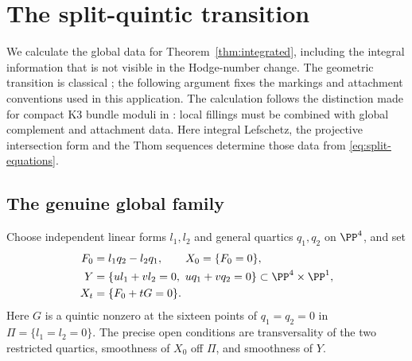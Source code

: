 \section{The split-quintic transition}\label{sec:quintic}

We calculate the global data for Theorem~\ref{thm:integrated}, including
the integral information that is not visible in the Hodge-number change.
The geometric transition is classical \cite{greene-morrison-strominger};
the following argument fixes the markings and attachment conventions
used in this application.
The calculation follows the distinction made for compact K3 bundle
moduli in \cite{wuebben-reconstruction,wuebben-attachments}: local
fillings must be combined with global complement and attachment data.
Here integral Lefschetz, the projective intersection form and the Thom
sequences determine those data from \eqref{eq:split-equations}.

\subsection{The genuine global family}
Choose independent linear forms $l_1,l_2$ and general quartics $q_1,q_2$
on $\PP^4$, and set
\begin{equation}\label{eq:split-equations}
 \begin{split}
 F_0&=l_1q_2-l_2q_1,\qquad X_0=\{F_0=0\},\\
 Y&=\{ul_1+vl_2=0,\ uq_1+vq_2=0\}
       \subset\PP^4\times\PP^1,\\
 X_t&=\{F_0+tG=0\}.
 \end{split}
\end{equation}
Here $G$ is a quintic nonzero at the sixteen points of
$q_1=q_2=0$ in $\Pi=\{l_1=l_2=0\}$. The precise open conditions
are transversality of the two restricted quartics, smoothness of $X_0$
off $\Pi$, and smoothness of $Y$.

